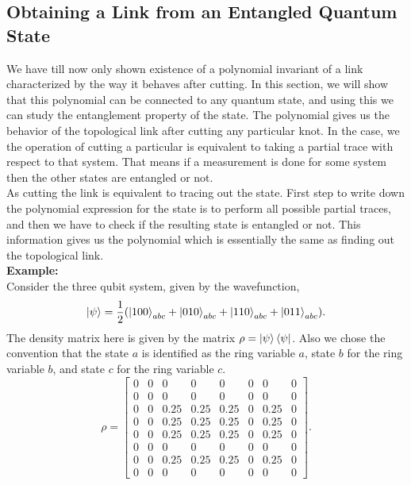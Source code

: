 \documentclass{scrartcl}
\begin{document}
\subsection{Obtaining a Link from an Entangled Quantum State}\label{link_from_state}
We have till now only shown existence of a polynomial invariant of a link characterized by the way it behaves after cutting. In this section, we will show that this polynomial can be connected to any quantum state, and using this we can study the entanglement property of the state.
The polynomial gives us the behavior of the topological link after cutting any particular knot. In the case, we the operation of cutting a particular is equivalent to taking a partial trace with respect to that system. That means if a measurement is done for some system then the other states are entangled or not. \\[0.3cm]
	As cutting the link is equivalent to tracing out the state. First step to write down the polynomial expression for the state is to perform all possible partial traces, and then we have to check if the resulting state is entangled or not. This information gives us the polynomial which is essentially the same as finding out the topological link.\\[0.3cm]
	\textbf{Example:}\\[0.3cm]
	Consider the three qubit system, given by the wavefunction, 
	 \begin{equation*}
	 	\ket{\psi} = \frac{1}{2} (\ket{100}_{abc} + \ket{010}_{abc} + \ket{110}_{abc}+ \ket{011}_{abc}).
	 \end{equation*}
 	The density matrix here is given by the matrix $\rho = \ket{\psi}\bra{\psi}$. Also we chose the convention that the state $a$ is identified as the ring variable $a$,  state $b$ for the ring variable $b$, and state $c$ for the ring variable $c$.
 	\begin{equation*}
 		\rho = \left[\begin{matrix}0 & 0 & 0 & 0 & 0 & 0 & 0 & 0\\0 & 0 & 0 & 0 & 0 & 0 & 0 & 0\\0 & 0 & 0.25 & 0.25 & 0.25 & 0 & 0.25 & 0\\0 & 0 & 0.25 & 0.25 & 0.25 & 0 & 0.25 & 0\\0 & 0 & 0.25 & 0.25 & 0.25 & 0 & 0.25 & 0\\0 & 0 & 0 & 0 & 0 & 0 & 0 & 0\\0 & 0 & 0.25 & 0.25 & 0.25 & 0 & 0.25 & 0\\0 & 0 & 0 & 0 & 0 & 0 & 0 & 0\end{matrix}\right].
 	\end{equation*}
\end{document}
